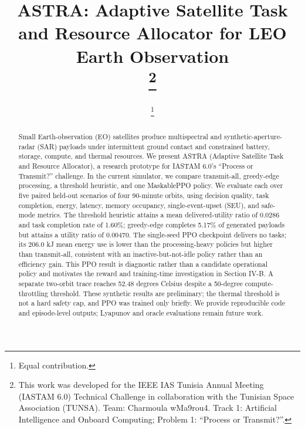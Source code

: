 \documentclass[conference]{IEEEtran}
\begin{document}
\title{ASTRA: Adaptive Satellite Task and Resource Allocator for LEO Earth Observation\\
\thanks{This work was developed for the IEEE IAS Tunisia Annual Meeting (IASTAM 6.0) Technical Challenge in collaboration with the Tunisian Space Association (TUNSA). Team: Charmoula wMa9rou4. Track 1: Artificial Intelligence and Onboard Computing; Problem 1: ``Process or Transmit?''.}
}

\author{
\and
{}
\thanks{Equal contribution.}
}

\maketitle

\begin{abstract}
Small Earth-observation (EO) satellites produce multispectral and synthetic-aperture-radar (SAR) payloads under intermittent ground contact and constrained battery, storage, compute, and thermal resources. We present ASTRA (Adaptive Satellite Task and Resource Allocator), a research prototype for IASTAM 6.0's ``Process or Transmit?'' challenge. In the current simulator, we compare transmit-all, greedy-edge processing, a threshold heuristic, and one MaskablePPO policy. We evaluate each over five paired held-out scenarios of four 90-minute orbits, using decision quality, task completion, energy, latency, memory occupancy, single-event-upset (SEU), and safe-mode metrics. The threshold heuristic attains a mean delivered-utility ratio of 0.0286 and task completion rate of 1.60\%; greedy-edge completes 5.17\% of generated payloads but attains a utility ratio of 0.00470. The single-seed PPO checkpoint delivers no tasks; its 206.0 kJ mean energy use is lower than the processing-heavy policies but higher than transmit-all, consistent with an inactive-but-not-idle policy rather than an efficiency gain. This PPO result is diagnostic rather than a candidate operational policy and motivates the reward and training-time investigation in Section IV-B. A separate two-orbit trace reaches 52.48 degrees Celsius despite a 50-degree compute-throttling threshold. These synthetic results are preliminary; the thermal threshold is not a hard safety cap, and PPO was trained only briefly. We provide reproducible code and episode-level outputs; Lyapunov and oracle evaluations remain future work.
\end{abstract}
\end{document}
